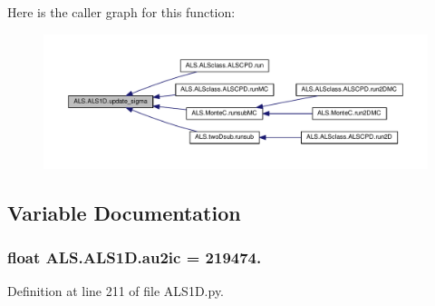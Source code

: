 Here is the caller graph for this function\+:
\nopagebreak
\begin{figure}[H]
\begin{center}
\leavevmode
\includegraphics[width=350pt]{namespace_a_l_s_1_1_a_l_s1_d_a994f6e3fde98eeeeb090fd856c2e4844_icgraph}
\end{center}
\end{figure}




\subsection{Variable Documentation}
\hypertarget{namespace_a_l_s_1_1_a_l_s1_d_a6225364b4130ce75f06fc87c2741007f}{
\subsubsection[{au2ic}]{\setlength{\rightskip}{0pt plus 5cm}float A\+L\+S.\+A\+L\+S1\+D.\+au2ic = 219474.}}\label{namespace_a_l_s_1_1_a_l_s1_d_a6225364b4130ce75f06fc87c2741007f}


Definition at line 211 of file A\+L\+S1\+D.\+py.

